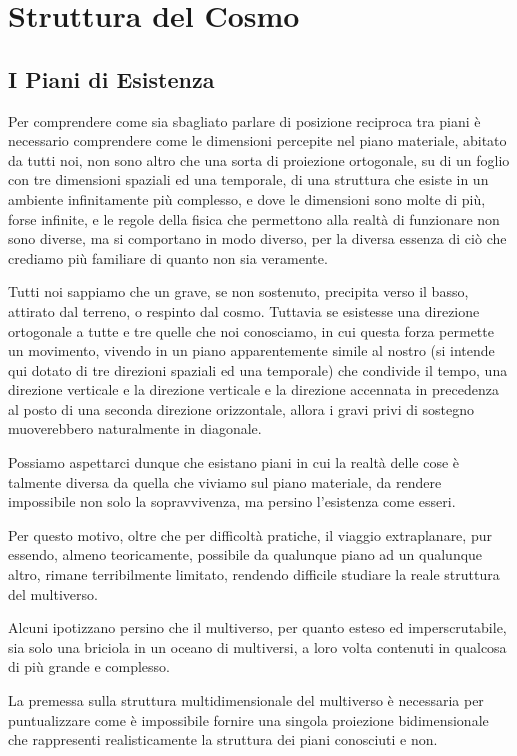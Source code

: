 \chapter{Struttura del Cosmo}

\section{I Piani di Esistenza}
Per comprendere come sia sbagliato parlare di posizione reciproca tra piani è necessario comprendere come le dimensioni percepite nel piano materiale, abitato da tutti noi, non sono altro che una sorta di proiezione ortogonale, su di un foglio con tre dimensioni spaziali ed una temporale, di una struttura che esiste in un ambiente infinitamente più complesso, e dove le dimensioni sono molte di più, forse infinite, e le regole della fisica che permettono alla realtà di funzionare non sono diverse, ma si comportano in modo diverso, per la diversa essenza di ciò che crediamo più familiare di quanto non sia veramente.

Tutti noi sappiamo che un grave, se non sostenuto, precipita verso il basso, attirato dal terreno, o respinto dal cosmo. Tuttavia se esistesse una direzione ortogonale a tutte e tre quelle che noi conosciamo, in cui questa forza permette un movimento, vivendo in un piano apparentemente simile al nostro (si intende qui dotato di tre direzioni spaziali ed una temporale) che condivide il tempo, una direzione verticale e la direzione verticale e la direzione accennata in precedenza al posto di una seconda direzione orizzontale, allora i gravi privi di sostegno muoverebbero naturalmente in diagonale.

Possiamo aspettarci dunque che esistano piani in cui la realtà delle cose è talmente diversa da quella che viviamo sul piano materiale, da rendere impossibile non solo la sopravvivenza, ma persino l’esistenza come esseri.

Per questo motivo, oltre che per difficoltà pratiche, il viaggio extraplanare, pur essendo, almeno teoricamente, possibile da qualunque piano ad un qualunque altro, rimane terribilmente limitato, rendendo difficile studiare la reale struttura del multiverso.

Alcuni ipotizzano persino che il multiverso, per quanto esteso ed imperscrutabile, sia solo una briciola in un oceano di multiversi, a loro volta contenuti in qualcosa di più grande e complesso.

La premessa sulla struttura multidimensionale del multiverso è necessaria per puntualizzare come è impossibile fornire una singola proiezione bidimensionale che rappresenti realisticamente la struttura dei piani conosciuti e non.


